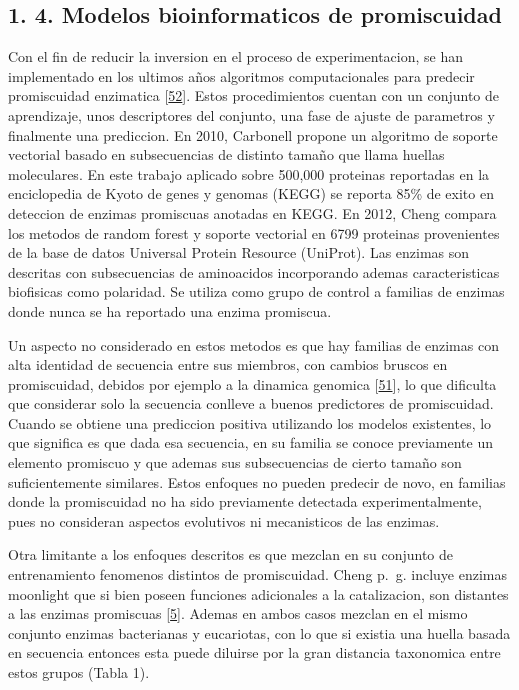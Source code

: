 \documentclass[12pt,twoside]{reedthesis}
\begin{document}
  \subsection{1. 4. Modelos bioinformaticos de
  promiscuidad}\label{modelos-bioinformaticos-de-promiscuidad}
  
  Con el fin de reducir la inversion en el proceso de experimentacion, se
  han implementado en los ultimos años algoritmos computacionales para
  predecir promiscuidad enzimatica
  {[}\protect\hyperlink{ref-carbonellux5fmolecularux5f2010}{52}{]}. Estos
  procedimientos cuentan con un conjunto de aprendizaje, unos descriptores
  del conjunto, una fase de ajuste de parametros y finalmente una
  prediccion. En 2010, Carbonell propone un algoritmo de soporte vectorial
  basado en subsecuencias de distinto tamaño que llama huellas
  moleculares. En este trabajo aplicado sobre 500,000 proteinas reportadas
  en la enciclopedia de Kyoto de genes y genomas (KEGG) se reporta 85\% de
  exito en deteccion de enzimas promiscuas anotadas en KEGG. En 2012,
  Cheng compara los metodos de random forest y soporte vectorial en 6799
  proteinas provenientes de la base de datos Universal Protein Resource
  (UniProt). Las enzimas son descritas con subsecuencias de aminoacidos
  incorporando ademas caracteristicas biofisicas como polaridad. Se
  utiliza como grupo de control a familias de enzimas donde nunca se ha
  reportado una enzima promiscua.
  
  Un aspecto no considerado en estos metodos es que hay familias de
  enzimas con alta identidad de secuencia entre sus miembros, con cambios
  bruscos en promiscuidad, debidos por ejemplo a la dinamica genomica
  {[}\protect\hyperlink{ref-noda-garciaux5fevolutionux5f2013}{51}{]}, lo
  que dificulta que considerar solo la secuencia conlleve a buenos
  predictores de promiscuidad. Cuando se obtiene una prediccion positiva
  utilizando los modelos existentes, lo que significa es que dada esa
  secuencia, en su familia se conoce previamente un elemento promiscuo y
  que ademas sus subsecuencias de cierto tamaño son suficientemente
  similares. Estos enfoques no pueden predecir de novo, en familias donde
  la promiscuidad no ha sido previamente detectada experimentalmente, pues
  no consideran aspectos evolutivos ni mecanisticos de las enzimas.
  
  Otra limitante a los enfoques descritos es que mezclan en su conjunto de
  entrenamiento fenomenos distintos de promiscuidad. Cheng p.~g. incluye
  enzimas moonlight que si bien poseen funciones adicionales a la
  catalizacion, son distantes a las enzimas promiscuas
  {[}\protect\hyperlink{ref-copleyux5fenzymesux5f2003}{5}{]}. Ademas en
  ambos casos mezclan en el mismo conjunto enzimas bacterianas y
  eucariotas, con lo que si existia una huella basada en secuencia
  entonces esta puede diluirse por la gran distancia taxonomica entre
  estos grupos (Tabla 1).
  
\end{document}
